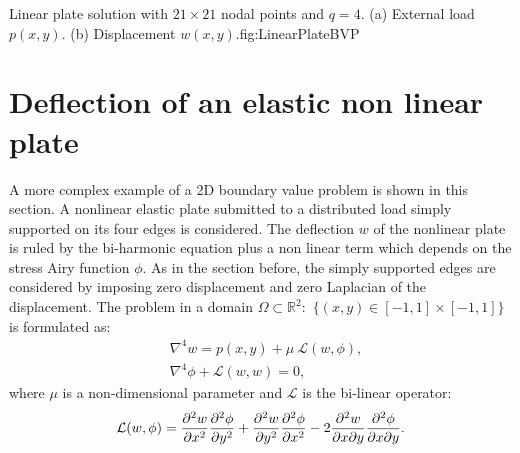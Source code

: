     

      \twographs
      {}
      {}
      {Linear plate solution with $21\times 21$ nodal points and $q=4$. (a) External load $p(x,y)$. (b) Displacement 
      $w(x,y)$.}{fig:LinearPlateBVP}
       
 \newpage	  
 \section{Deflection of an elastic non linear plate}
   
A more complex example of a 2D boundary value problem is shown in this section. A nonlinear elastic plate submitted to a distributed load 
simply supported on its four edges is considered. The deflection $w$ of the nonlinear plate is ruled by the bi-harmonic equation plus a non 
linear term which  depends on the stress Airy function $\phi$. As in the section before, the simply supported edges are considered by 
imposing zero displacement and zero Laplacian of the displacement. The problem in a domain $\Omega \subset \mathbb{R}^2 : $ $\{(x,y)\in  
[-1,1]\times [-1,1]\}$ is formulated as:
          \begin{align*}
          & \nabla^4 w = p(x,y)  + \mu \ \mathcal{L}(w,\phi),  \\ 
          & \nabla^4 \phi  + \mathcal{L}(w,w) =0,
          \end{align*}
          where $\mu$ is a non-dimensional parameter and $\mathcal{L}$ is the bi-linear operator:
          \begin{align*}
          	\mathcal{L}(w,\phi)
          	=
          	\pdv[2]{w}{x}\pdv[2]{\phi}{y}
          	+
          	\pdv[2]{w}{y}\pdv[2]{\phi}{x}
          	-
          	2\pdv[2]{w}{x}{y}\pdv[2]{\phi}{x}{y}.
          \end{align*}
          
